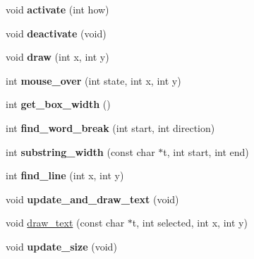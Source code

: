\begin{DoxyCompactItemize}
\item 
\hypertarget{classGLUI__List_a27aad35685565ffae7182b432dbfb2d6}{void {\bfseries activate} (int how)}\label{classGLUI__List_a27aad35685565ffae7182b432dbfb2d6}

\item 
\hypertarget{classGLUI__List_a862ebf586380a13b1e17bf00ee06cc40}{void {\bfseries deactivate} (void)}\label{classGLUI__List_a862ebf586380a13b1e17bf00ee06cc40}

\item 
\hypertarget{classGLUI__List_a9cecff476afad9849416acaf568d8f1a}{void {\bfseries draw} (int x, int y)}\label{classGLUI__List_a9cecff476afad9849416acaf568d8f1a}

\item 
\hypertarget{classGLUI__List_a9946699ea4a63516620440dc9cb503f5}{int {\bfseries mouse\-\_\-over} (int state, int x, int y)}\label{classGLUI__List_a9946699ea4a63516620440dc9cb503f5}

\item 
\hypertarget{classGLUI__List_a08c3ad15db735454006faa1dcba6f461}{int {\bfseries get\-\_\-box\-\_\-width} ()}\label{classGLUI__List_a08c3ad15db735454006faa1dcba6f461}

\item 
\hypertarget{classGLUI__List_a1ca6f966a881d67dc039c6d6fc0e8f15}{int {\bfseries find\-\_\-word\-\_\-break} (int start, int direction)}\label{classGLUI__List_a1ca6f966a881d67dc039c6d6fc0e8f15}

\item 
\hypertarget{classGLUI__List_a305864cc3614e17a6ef47e5989c8cd21}{int {\bfseries substring\-\_\-width} (const char $\ast$t, int start, int end)}\label{classGLUI__List_a305864cc3614e17a6ef47e5989c8cd21}

\item 
\hypertarget{classGLUI__List_a3315c82b5aef8f476de85ea90d2a8421}{int {\bfseries find\-\_\-line} (int x, int y)}\label{classGLUI__List_a3315c82b5aef8f476de85ea90d2a8421}

\item 
\hypertarget{classGLUI__List_af83459297185924a6ef9c8ce5618f571}{void {\bfseries update\-\_\-and\-\_\-draw\-\_\-text} (void)}\label{classGLUI__List_af83459297185924a6ef9c8ce5618f571}

\item 
void \hyperlink{classGLUI__List_a5ce43d2a245edb348e220f7788f31ab7}{draw\-\_\-text} (const char $\ast$t, int selected, int x, int y)
\item 
\hypertarget{classGLUI__List_ab90ecf239cc0deaf4739d636c986d747}{void {\bfseries update\-\_\-size} (void)}\label{classGLUI__List_ab90ecf239cc0deaf4739d636c986d747}


\end{DoxyCompactItemize}
